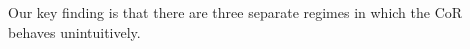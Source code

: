 \documentclass[preview]{standalone}
\begin{document}
\begin{center}
Our key finding is that there are three separate regimes in which the CoR behaves unintuitively.
\end{center}
\end{document}
